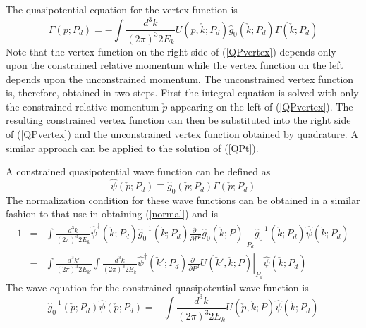 \documentclass[mythesis.tex]{subfiles}
\begin{document}
The quasipotential equation for the vertex function is
%
\begin{equation}
\Gamma(p;P_d)=-\int\frac{d^3k}{(2\pi)^3 2E_k} U(p,\check k;P_d)
\hat g_0(\check k;P_d)
\Gamma(\check k;P_d)\label{QPvertex}
\end{equation}
%
Note that the vertex function on the right side of (\ref{QPvertex}) depends
only upon the constrained relative momentum while the vertex function on
the left depends upon the unconstrained momentum. The unconstrained
vertex function is, therefore, obtained in two steps. First the integral
equation is solved with only the constrained relative momentum $\check p$
appearing on the left of (\ref{QPvertex}). The resulting constrained
vertex function can then be substituted into the right side of (\ref{QPvertex})
and the unconstrained vertex function obtained by quadrature. A similar
approach can be applied to the solution of (\ref{QPt}).

A constrained quasipotential wave function can be defined as
%
\begin{equation}
\hat\psi(\check p;P_d)\equiv \hat g_0(\check p;P_d) \Gamma(\check p;P_d)
\end{equation}
%
The normalization condition for these wave functions can be obtained in a
similar fashion to that use in obtaining (\ref{normal}) and is
%
\begin{eqnarray}
1&=&\int\frac{d^3k}{(2\pi)^3 2 E_k}\hat\psi^\dagger(\check k;P_d)
\hat g^{-1}_0(\check k;P_d)
\left. \frac{\partial ~~}{\partial P^2}\hat g_0(\check k;P)
\right|_{P_d}\hat g^{-1}_0(\check k;P_d)
\hat \psi(\check k;P_d)
\nonumber\\
&-&\int\frac{d^3k'}{(2\pi)^3 2 E_{k'}}\int\frac{d^3k}{(2\pi)^3 2 E_k}
\hat \psi^\dagger(\check k';P_d)\left. \frac{\partial ~~}{\partial P^2}
U(\check k',\check k;P)\right|_{P_d} \hat \psi(\check k;P_d) \label{QPnormal}
\end{eqnarray}
%
The wave equation for the constrained quasipotential wave function is
%
\begin{equation}
\hat g^{-1}_0(\check p;P_d)\hat\psi(\check p;P_d)=
-\int\frac{d^3k}{(2\pi)^3 2 E_k}U(\check p,\check k;P)
\hat \psi(\check k;P_d)\label{QPwaveEq}
\end{equation}
\end{document}
